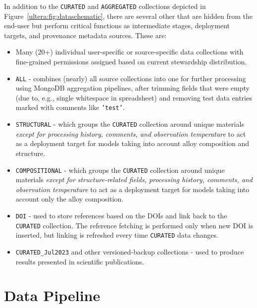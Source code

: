 In addition to the \texttt{CURATED} and \texttt{AGGREGATED} collections depicted in Figure~\ref{ultera:fig:dataschematic}, there are several other that are hidden from the end-user but perform critical functions as intermediate stages, deployment targets, and provenance metadata sources. These are:
\begin{itemize}
    \item Many (20+) individual user-specific or source-specific data collections with fine-grained permissions assigned based on current stewardship distribution. 


    \item \texttt{ALL} - combines (nearly) all source collections into one for further processing using MongoDB aggregation pipelines, after trimming fields that were empty (due to, e.g., single whitespace in spreadsheet) and removing test data entries marked with comments like \texttt{'test'}.


    \item \texttt{STRUCTURAL} - which groups the \texttt{CURATED} collection around unique materials \emph{except for processing history, comments, and observation temperature} to act as a deployment target for models taking into account alloy composition and structure.


    \item \texttt{COMPOSITIONAL} - which groups the \texttt{CURATED} collection around unique materials \emph{except for structure-related fields, processing history, comments, and observation temperature} to act as a deployment target for models taking into account only the alloy composition.


    \item \texttt{DOI} - used to store references based on the DOIs and link back to the \texttt{CURATED} collection. The reference fetching is performed only when new DOI is inserted, but linking is refreshed every time \texttt{CURATED} data changes.

    \item \texttt{CURATED\_Jul2023} and other versioned-backup collections - used to produce results presented in scientific publications.
\end{itemize}



\section{Data Pipeline} \label{ultera:sec:pipeline}

